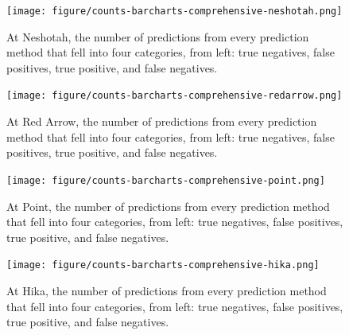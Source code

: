 \documentclass[authoryear,review, 12pt]{elsarticle}
\begin{document}
\begin{figure}[htbp]
\centering
\texttt{[image: figure/counts-barcharts-comprehensive-neshotah.png]}
\caption{At Neshotah, the number of predictions from every prediction
method that fell into four categories, from left: true negatives, false
positives, true positive, and false negatives.}
\end{figure}

\begin{figure}[htbp]
\centering
\texttt{[image: figure/counts-barcharts-comprehensive-redarrow.png]}
\caption{At Red Arrow, the number of predictions from every prediction
method that fell into four categories, from left: true negatives, false
positives, true positive, and false negatives.}
\end{figure}

\begin{figure}[htbp]
\centering
\texttt{[image: figure/counts-barcharts-comprehensive-point.png]}
\caption{At Point, the number of predictions from every prediction
method that fell into four categories, from left: true negatives, false
positives, true positive, and false negatives.}
\end{figure}

\begin{figure}[htbp]
\centering
\texttt{[image: figure/counts-barcharts-comprehensive-hika.png]}
\caption{At Hika, the number of predictions from every prediction method
that fell into four categories, from left: true negatives, false
positives, true positive, and false negatives.}
\end{figure}

 


 
 
\end{document}

